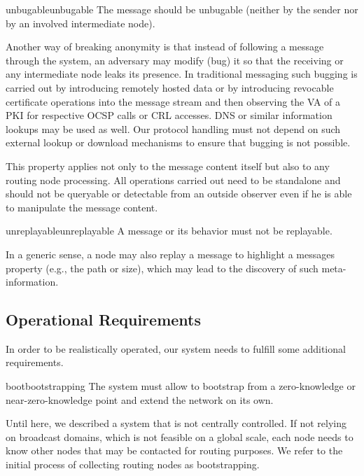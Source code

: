 \begin{requirement}{unbugable}{unbugable}
	The message should be unbugable (neither by the sender nor by an involved intermediate node).
\end{requirement}

Another way of breaking anonymity is that instead of following a message through the system, an adversary may modify (bug) it so that the receiving or any intermediate node leaks its presence. In traditional messaging such bugging is carried out by introducing remotely hosted data or by introducing revocable certificate operations into the message stream and then observing the VA of a PKI for respective OCSP calls or CRL accesses. DNS or similar information lookups may be used as well. Our protocol handling must not depend on such external lookup or download mechanisms to ensure that bugging is not possible.

This property applies not only to the message content itself but also to any routing node processing. All operations carried out need to be standalone and should not be queryable or detectable from an outside observer even if he is able to manipulate the message content.

\begin{requirement}{unreplayable}{unreplayable}
	A message or its behavior must not be replayable.
\end{requirement}

In a generic sense, a node may also replay a message to highlight a messages property (e.g., the path or size), which may lead to the discovery of such meta-information. 

\subsection{Operational Requirements}
In order to be realistically operated, our system needs to fulfill some additional requirements.

\begin{requirement}{boot}{bootstrapping}
	The system must allow to bootstrap from a zero-knowledge or near-zero-knowledge point and extend the network on its own. 
\end{requirement}
Until here, we described a system that is not centrally controlled. If not relying on broadcast domains, which is not feasible on a global scale, each node needs to know other nodes that may be contacted for routing purposes. We refer to the initial process of collecting routing nodes as bootstrapping.

